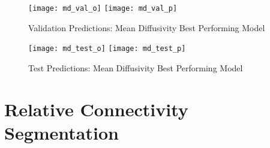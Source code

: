 \begin{figure}[H]
\centering
\texttt{[image: md\_val\_o]}
\texttt{[image: md\_val\_p]}
\caption{Validation Predictions: Mean Diffusivity Best Performing Model}
\label{fig:pred-val-md}
\end{figure}

\begin{figure}[H]
\centering
\texttt{[image: md\_test\_o]}
\texttt{[image: md\_test\_p]}
\caption{Test Predictions: Mean Diffusivity Best Performing Model}
\label{fig:pred-tes-md}
\end{figure}

\section{Relative Connectivity Segmentation}

